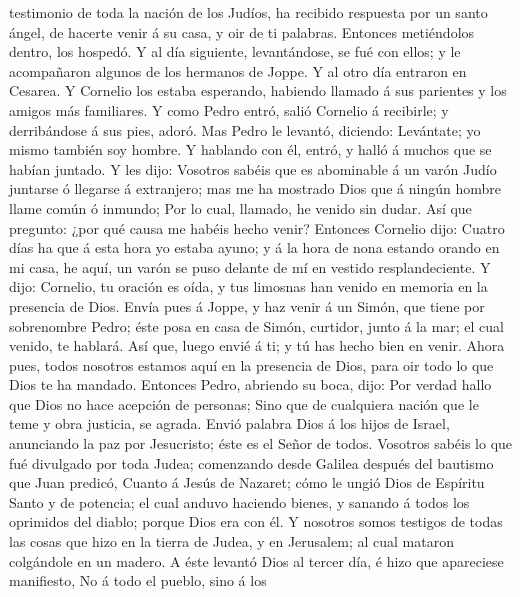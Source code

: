 testimonio de toda la nación de los Judíos, ha recibido respuesta por un
santo ángel, de hacerte venir á su casa, y oir de ti palabras.
 Entonces metiéndolos dentro, los hospedó. Y al día
siguiente, levantándose, se fué con ellos; y le acompañaron algunos de
los hermanos de Joppe.  Y al otro día entraron en
Cesarea. Y Cornelio los estaba esperando, habiendo llamado á sus
parientes y los amigos más familiares.  Y como Pedro
entró, salió Cornelio á recibirle; y derribándose á sus pies, adoró.
 Mas Pedro le levantó, diciendo: Levántate; yo mismo
también soy hombre.  Y hablando con él, entró, y halló á
muchos que se habían juntado.  Y les dijo: Vosotros
sabéis que es abominable á un varón Judío juntarse ó llegarse á
extranjero; mas me ha mostrado Dios que á ningún hombre llame común ó
inmundo;  Por lo cual, llamado, he venido sin dudar. Así
que pregunto: ¿por qué causa me habéis hecho venir? 
Entonces Cornelio dijo: Cuatro días ha que á esta hora yo estaba ayuno;
y á la hora de nona estando orando en mi casa, he aquí, un varón se puso
delante de mí en vestido resplandeciente.  Y dijo:
Cornelio, tu oración es oída, y tus limosnas han venido en memoria en la
presencia de Dios.  Envía pues á Joppe, y haz venir á un
Simón, que tiene por sobrenombre Pedro; éste posa en casa de Simón,
curtidor, junto á la mar; el cual venido, te hablará. 
Así que, luego envié á ti; y tú has hecho bien en venir. Ahora pues,
todos nosotros estamos aquí en la presencia de Dios, para oir todo lo
que Dios te ha mandado.  Entonces Pedro, abriendo su
boca, dijo: Por verdad hallo que Dios no hace acepción de personas;
 Sino que de cualquiera nación que le teme y obra
justicia, se agrada.  Envió palabra Dios á los hijos de
Israel, anunciando la paz por Jesucristo; éste es el Señor de todos.
 Vosotros sabéis lo que fué divulgado por toda Judea;
comenzando desde Galilea después del bautismo que Juan predicó,
 Cuanto á Jesús de Nazaret; cómo le ungió Dios de
Espíritu Santo y de potencia; el cual anduvo haciendo bienes, y sanando
á todos los oprimidos del diablo; porque Dios era con él.
 Y nosotros somos testigos de todas las cosas que hizo en
la tierra de Judea, y en Jerusalem; al cual mataron colgándole en un
madero.  A éste levantó Dios al tercer día, é hizo que
apareciese manifiesto,  No á todo el pueblo, sino á los
